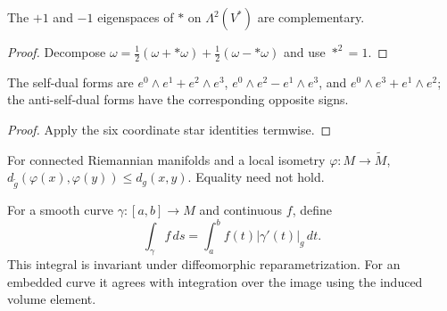 \begin{proposition}
\label{prop:self-dual-decomposition}
\leanok
{}
The $+1$ and $-1$ eigenspaces of $*$ on $\Lambda^2(V^*)$ are complementary.
\end{proposition}
\begin{proof}
\leanok
\sketch Decompose $\omega=\frac12(\omega+*\omega)+\frac12(\omega-*\omega)$ and use $*^2=1$.
\end{proof}

\begin{proposition}
\label{prop:self-dual-euclidean}
\leanok
{}
The self-dual forms are $e^0\wedge e^1+e^2\wedge e^3$, $e^0\wedge e^2-e^1\wedge e^3$, and $e^0\wedge e^3+e^1\wedge e^2$; the anti-self-dual forms have the corresponding opposite signs.
\end{proposition}
\begin{proof}
\leanok
{}
\sketch Apply the six coordinate star identities termwise.
\end{proof}

\begin{proposition}\label{prop:local-isometry-distance}
\leanok
For connected Riemannian manifolds and a local isometry
$\varphi:M\to\widetilde M$,
$d_{\widetilde g}(\varphi(x),\varphi(y))\le d_g(x,y)$. Equality need not hold.
\end{proposition}

\begin{proposition}\label{prop:arc-length-integral}
For a smooth curve $\gamma:[a,b]\to M$ and continuous $f$, define
\[
\int_\gamma f\,ds=\int_a^bf(t)|\gamma'(t)|_g\,dt.
\]
This integral is invariant under diffeomorphic reparametrization. For an
embedded curve it agrees with integration over the image using the induced
volume element.
\end{proposition}
